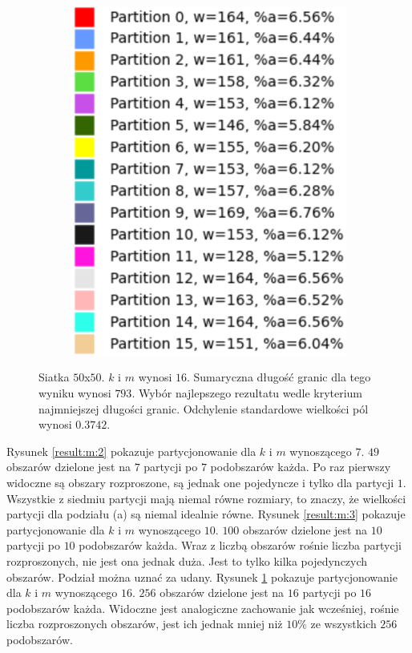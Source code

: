 \begin{figure}[h]
\begin{subfigure}{.33\textwidth}
    \includegraphics[width=0.9\linewidth]{images/results/m/4/results}
    \caption[short]{}
\end{subfigure}
\caption{Siatka $50$x$50$. $k$ i $m$ wynosi $16$.
Sumaryczna długość granic dla tego wyniku wynosi $793$.
Wybór najlepszego rezultatu wedle kryterium najmniejszej długości granic.
Odchylenie standardowe wielkości pól wynosi $0.3742$.}
\label{result:m:4}
\end{figure}
\Floatbarrier


Rysunek \ref{result:m:2} pokazuje partycjonowanie dla $k$ i $m$ wynoszącego $7$.
$49$ obszarów dzielone jest na $7$ partycji po $7$ podobszarów każda.
Po raz pierwszy widoczne są obszary rozproszone, są jednak one pojedyncze i tylko dla partycji $1$.
Wszystkie z siedmiu partycji mają niemal równe rozmiary, to znaczy, że wielkości partycji dla podziału (a) są
niemal idealnie równe.
Rysunek \ref{result:m:3} pokazuje partycjonowanie dla $k$ i $m$ wynoszącego $10$.
$100$ obszarów dzielone jest na $10$ partycji po $10$ podobszarów każda.
Wraz z liczbą obszarów rośnie liczba partycji rozproszonych, nie jest ona jednak duża.
Jest to tylko kilka pojedynczych obszarów.
Podział można uznać za udany.
Rysunek \ref{result:m:4} pokazuje partycjonowanie dla $k$ i $m$ wynoszącego $16$.
$256$ obszarów dzielone jest na $16$ partycji po $16$ podobszarów każda.
Widoczne jest analogiczne zachowanie jak wcześniej, rośnie liczba rozproszonych obszarów, jest ich jednak
mniej niż $10\%$ ze wszystkich $256$ podobszarów.

